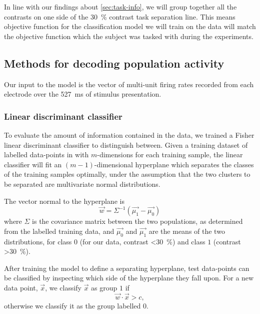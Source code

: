 
In line with our findings about \autoref{sec:task-info}, we will group together all the contrasts on one side of the \SI{30}{\percent} contrast task separation line.
This means objective function for the classification model we will train on the data will match the objective function which the subject was tasked with during the experiments.


\subsection{Methods for decoding population activity}

Our input to the model is the vector of multi-unit firing rates recorded from each electrode over the \SI{527}{\milli\second} of stimulus presentation.


\subsubsection{Linear discriminant classifier}

To evaluate the amount of information contained in the data, we trained a Fisher linear discriminant classifier to distinguish between.
Given a training dataset of labelled data-points in with $m$-dimensions for each training sample, the linear classifier will fit an $(m-1)$-dimensional hyperplane which separates the classes of the training samples optimally, under the assumption that the two clusters to be separated are multivariate normal distributions.

The vector normal to the hyperplane is 
\begin{equation}
\vec{w} = \Sigma^{-1}\left(\vec{\mu_1}-\vec{\mu_0}\right)
\end{equation}
where $\Sigma$ is the covariance matrix between the two populations, as determined from the labelled training data, and $\vec{\mu_0}$ and $\vec{\mu_1}$ are the means of the two distributions, for class $0$ (for our data, contrast \SI{<30}{\percent}) and class $1$ (contrast \SI{>30}{\percent}).

After training the model to define a separating hyperplane, test data-points can be classified by inspecting which side of the hyperplane they fall upon.
For a new data point, $\vec{x}$, we classify $\vec{x}$ as group $1$ if
\begin{equation}
\vec{w}\cdot\vec{x}>c
,\end{equation}
otherwise we classify it as the group labelled $0$.

